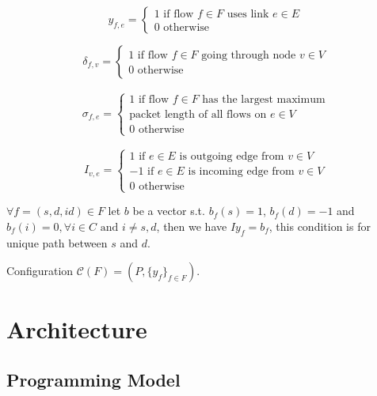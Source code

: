 \documentclass[conference, twocolumn]{IEEEtran}
\theoremstyle{definition}
\begin{document}
\begin{equation}
y_{f,e} = \left\{ \begin{array}{lrc}
1 \mbox{ if flow } f \in F \mbox{ uses link } e \in E \\
0 \mbox{ otherwise} 
\end{array}\right.
\end{equation}

\begin{equation}
\delta_{f,v} = \left\{ \begin{array}{lrc}
1 \mbox{ if flow } f \in F \mbox{ going through node } v \in V \\
0 \mbox{ otherwise} 
\end{array}\right.
\end{equation}

\begin{eqnarray}
\sigma_{f,e} = \left\{ \begin{array}{lrc}
1 \mbox{ if flow } f \in F \mbox{ has the largest maximum} \\
\mbox{packet length of all flows on } e \in V \\ 
0 \mbox{ otherwise} 
\end{array}\right.
\end{eqnarray}

\begin{equation}
I_{v,e} = \left\{ \begin{array}{lrc}
1 \mbox{ if } e \in E \mbox{ is outgoing edge from } v \in V \\
-1 \mbox{ if } e \in E \mbox{ is incoming edge from } v \in V \\
0 \mbox{ otherwise}
\end{array}\right. 
\end{equation}

$\forall f=(s, d, id) \in F$  let $b$ be a vector s.t. $b_f(s) = 1$, 
$b_f(d) = -1$ and $b_f(i) = 0, \forall i \in C \mbox{ and } i \neq s, d$,
 then we have $Iy_f=b_f$, this condition is for unique path between $s$ and $d$.

Configuration $\mathcal{C}(F)=(P, \{y_f\}_{f \in F})$.
\section{Architecture}
\subsection{Programming Model}
\end{document}
